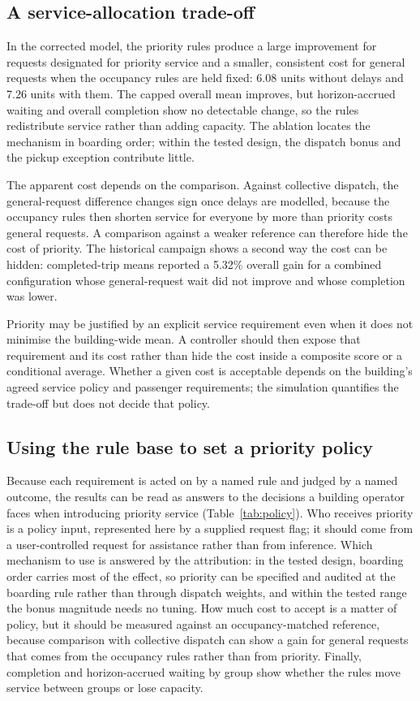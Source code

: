 \subsection{A service-allocation trade-off}\label{a-service-allocation-trade-off}

In the corrected model, the priority rules produce a large improvement for requests designated for priority service and a smaller, consistent cost for general requests when the occupancy rules are held fixed: 6.08 units without delays and 7.26 units with them. The capped overall mean improves, but horizon-accrued waiting and overall completion show no detectable change, so the rules redistribute service rather than adding capacity. The ablation locates the mechanism in boarding order; within the tested design, the dispatch bonus and the pickup exception contribute little.

The apparent cost depends on the comparison. Against collective dispatch, the general-request difference changes sign once delays are modelled, because the occupancy rules then shorten service for everyone by more than priority costs general requests. A comparison against a weaker reference can therefore hide the cost of priority. The historical campaign shows a second way the cost can be hidden: completed-trip means reported a 5.32\% overall gain for a combined configuration whose general-request wait did not improve and whose completion was lower.

Priority may be justified by an explicit service requirement even when it does not minimise the building-wide mean. A controller should then expose that requirement and its cost rather than hide the cost inside a composite score or a conditional average. Whether a given cost is acceptable depends on the building's agreed service policy and passenger requirements; the simulation quantifies the trade-off but does not decide that policy.

\subsection{Using the rule base to set a priority policy}\label{sec:policy}

Because each requirement is acted on by a named rule and judged by a named outcome, the results can be read as answers to the decisions a building operator faces when introducing priority service (Table~\ref{tab:policy}). Who receives priority is a policy input, represented here by a supplied request flag; it should come from a user-controlled request for assistance rather than from inference. Which mechanism to use is answered by the attribution: in the tested design, boarding order carries most of the effect, so priority can be specified and audited at the boarding rule rather than through dispatch weights, and within the tested range the bonus magnitude needs no tuning. How much cost to accept is a matter of policy, but it should be measured against an occupancy-matched reference, because comparison with collective dispatch can show a gain for general requests that comes from the occupancy rules rather than from priority. Finally, completion and horizon-accrued waiting by group show whether the rules move service between groups or lose capacity.

